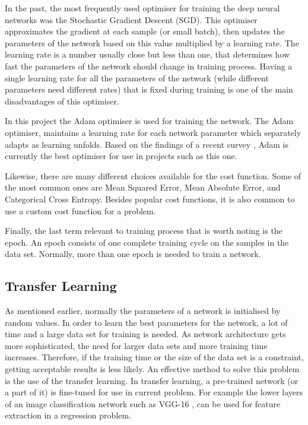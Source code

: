 In the past, the most frequently used optimiser for training the deep neural networks was the Stochastic Gradient Descent (SGD). This optimiser approximates the gradient at each sample (or small batch), then updates the parameters of the network based on this value multiplied by a learning rate. The learning rate is a number usually close but less than one, that determines how fast the parameters of the network should change in training process. Having a single learning rate for all the parameters of the network (while different parameters need different rates) that is fixed during training is one of the main disadvantages of this optimiser. 

In this project the Adam optimiser \cite{adam} is used for training the network. The Adam optimiser, maintains a learning rate for each network parameter which separately adapts as learning unfolds. Based on the findings of a recent survey \cite{bestoptimiser}, Adam is currently the best optimiser for use in projects such as this one. 

Likewise, there are many different choices available for the cost function. Some of the most common ones are Mean Squared Error, Mean Absolute Error, and Categorical Cross Entropy. Besides popular cost functions, it is also common to use a custom cost function for a problem.  

Finally, the last term relevant to training process that is worth noting is the epoch. An epoch consists of one complete training cycle on the samples in the data set. Normally, more than one epoch is needed to train a network. 

\subsection{Transfer Learning}

As mentioned earlier, normally the parameters of a network is initialised by random values. In order to learn the best parameters for the network, a lot of time and a large data set for training is needed. As network architecture gets more sophisticated, the need for larger data sets and more training time increases. Therefore, if the training time or the size of the data set is a constraint, getting acceptable results is less likely. An effective method to solve this problem is the use of the transfer learning. In transfer learning, a pre-trained network (or a part of it) is fine-tuned for use in current problem. For example the lower layers of an image classification network such as VGG-16 \cite{vgg}, can be used for feature extraction in a regression problem. 


